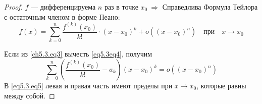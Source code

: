 \begin{proof}
$f$ --- дифференцируема $n$ раз в точке $x_0 \ \Rightarrow$
Справедлива Формула Тейлора с остаточным членом в форме Пеано:
\begin{equation} \label{eq5.3eq4}
f(x) = \sum_{k = 0}^{n} \frac{f^{(k)}(x_0)}{k!} \cdot (x - x_0)^k + o((x - x_0)^n) \quad \text{при} \quad x \to x_0
\end{equation}

Если из \eqref{ch5.3.eq3} вычесть \eqref{eq5.3eq4}, получим
\begin{equation} \label{eq5.3.eq5}
\sum\limits_{k = 0}^{n} \left( \frac{f^{(k)}(x_0)}{k!} - a_k \right) (x - x_0)^k = o((x - x_0)^n)
\end{equation}
В \eqref{eq5.3.eq5} левая и правая часть имеют пределы при $x \to x_0$, которые равны между собой.
\end{proof}